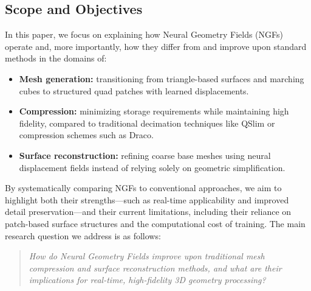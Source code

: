 \subsection{Scope and Objectives}
In this paper, we focus on explaining how Neural Geometry Fields (NGFs) operate and, more importantly, how they differ from and improve upon standard methods in the domains of:
\begin{itemize}
    \item \textbf{Mesh generation:} transitioning from triangle-based surfaces and marching cubes to structured quad patches with learned displacements.
    \item \textbf{Compression:} minimizing storage requirements while maintaining high fidelity, compared to traditional decimation techniques like QSlim or compression schemes such as Draco.
    \item \textbf{Surface reconstruction:} refining coarse base meshes using neural displacement fields instead of relying solely on geometric simplification.
\end{itemize}
By systematically comparing NGFs to conventional approaches, we aim to highlight both their strengths—such as real-time applicability and improved detail preservation—and their current limitations, including their reliance on patch-based surface structures and the computational cost of training.
The main research question we address is as follows:
\begin{quote}
\emph{How do Neural Geometry Fields improve upon traditional mesh compression and surface reconstruction methods, and what are their implications for real-time, high-fidelity 3D geometry processing?}
\end{quote}